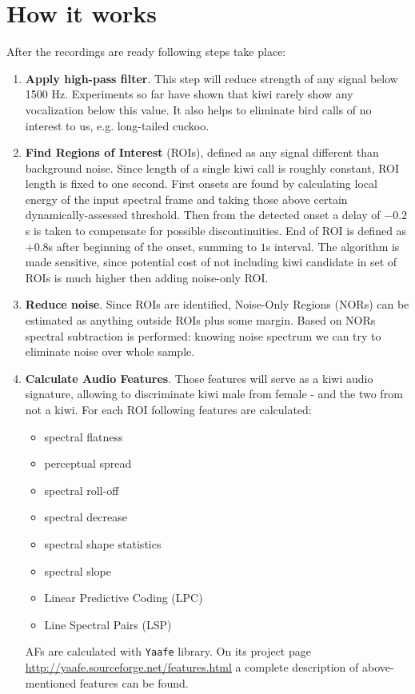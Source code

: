\documentclass[paper=a4, fontsize=11pt]{scrartcl}	%
\numberwithin{equation}{section}		%
\numberwithin{figure}{section}			%
\numberwithin{table}{section}				%
\begin{document}
\section{How it works}
After the recordings are ready following steps take place:
\begin{enumerate}
	\item \textbf{Apply high-pass filter}. This step will reduce strength of any signal below 1500 Hz. Experiments so far have shown that kiwi rarely show any vocalization below this value. It also helps to eliminate bird calls of no interest to us, e.g. long-tailed cuckoo.
	\item \textbf{Find Regions of Interest} (ROIs), defined as any signal different than background noise. Since length of a single kiwi call is roughly constant, ROI length is fixed to one second. First onsets are found by calculating local energy of the input spectral frame and taking those above certain dynamically-assessed threshold. Then from the detected onset a delay of $-0.2$s is taken to compensate for possible discontinuities. End of ROI is defined as $+0.8$s after beginning of the onset, summing to $1$s interval. The algorithm is made sensitive, since potential cost of not including kiwi candidate in set of ROIs is much higher then adding noise-only ROI.
	\item \textbf{Reduce noise}. Since ROIs are identified, Noise-Only Regions (NORs) can be estimated as anything outside ROIs plus some margin. Based on NORs spectral subtraction is performed: knowing noise spectrum we can try to eliminate noise over whole sample.
	\item \textbf{Calculate Audio Features}. Those features will serve as a kiwi audio signature, allowing to discriminate kiwi male from female - and the two from not a kiwi. For each ROI following features are calculated:
	\begin{itemize}
		\item spectral flatness
		\item perceptual spread
		\item spectral roll-off
		\item spectral decrease
		\item spectral shape statistics
		\item spectral slope
		\item Linear Predictive Coding (LPC)
		\item Line Spectral Pairs (LSP)
	\end{itemize}
	AFs are calculated with \texttt{Yaafe} library. On its project page \url{http://yaafe.sourceforge.net/features.html} a complete description of above-mentioned features can be found.

\end{enumerate}
\end{document}
